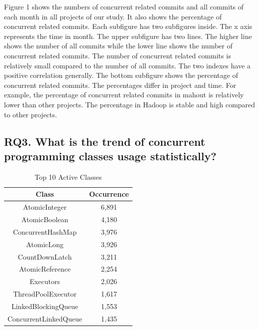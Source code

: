 Figure 1 shows the numbers of concurrent related commits and all commits of each month in all projects of our study. It also shows the percentage of concurrent related commits. Each subfigure has two subfigures inside. The x axis represents the time in month. The upper subfigure has two lines. The higher line shows the number of all commits while the lower line shows the number of concurrent related commits. The number of concurrent related commits is relatively small compared to the number of all commits. The two indexes have a positive correlation generally. The bottom subfigure shows the percentage of concurrent related commits. The percentages differ in project and time. For example, the percentage of concurrent related commits in mahout is relatively lower than other projects. The percentage in Hadoop is stable and high compared to other projects.

\subsection{RQ3. What is the trend of concurrent programming classes usage statistically?}
\label{sec:result:trend}
\begin{table}
	\centering
	\caption{Top 10 Active Classes}
	\begin{tabular}{|c|c|}\hline
		Class&Occurrence\\\hline
		AtomicInteger&6,891\\
		AtomicBoolean&4,180\\
		ConcurrentHashMap&3,976\\
		AtomicLong&3,926\\
		CountDownLatch&3,211\\
		AtomicReference&2,254\\
		Executors&2,026\\
		ThreadPoolExecutor&1,617\\
		LinkedBlockingQueue&1,553\\
		ConcurrentLinkedQueue&1,435\\\hline
	\end{tabular}
\end{table}

%

